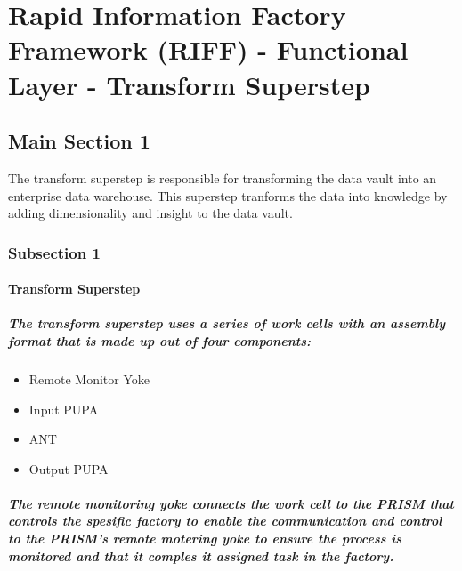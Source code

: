 
\chapter{Rapid Information Factory Framework (RIFF) - Functional Layer - Transform Superstep} %

\label{Chapter14} %



\section{Main Section 1}

The transform superstep is responsible for transforming the data vault into an enterprise data warehouse. This superstep tranforms the data into knowledge by adding dimensionality and insight to the data vault.

\subsection{Subsection 1}

\subsubsection{Transform Superstep}
\paragraph{The transform superstep uses a series of work cells with an assembly format that is made up out of four components:}
\begin{itemize}
\item{Remote Monitor Yoke}
\item{Input PUPA}
\item{ANT}
\item{Output PUPA}
\end{itemize}
\paragraph{The remote monitoring yoke connects the work cell to the PRISM that controls the spesific factory to enable the communication and control to the PRISM's remote motering yoke to ensure the process is monitored and that it comples it assigned task in the factory.}
